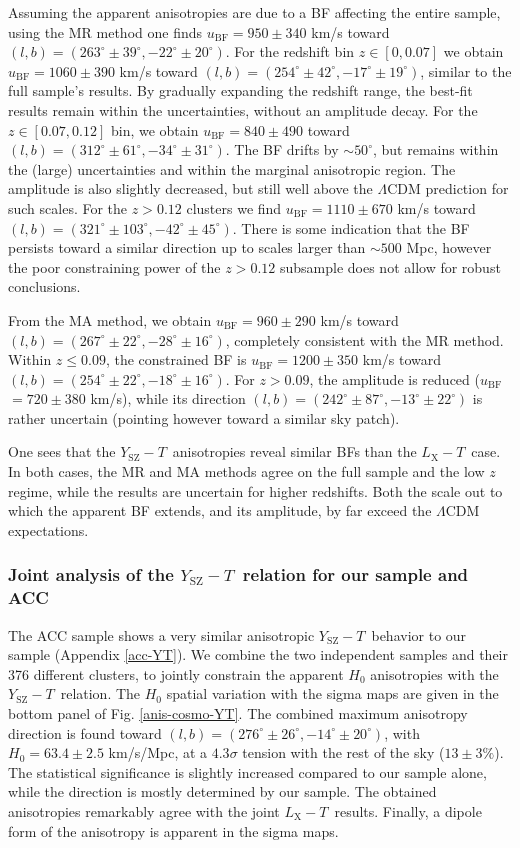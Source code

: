 \documentclass{aa}   %
\newcommand{\LT}{$L_{\text{X}}-T$}
\newcommand{\YT}{$Y_{\text{SZ}}-T$}
\newcommand{\ubf}{$u_{\text{BF}}$}
\begin{document}
Assuming the apparent anisotropies are due to a BF affecting the entire sample, using the MR method one finds \ubf$=950\pm 340$ km/s toward $(l,b)=(263^{\circ}\pm 39^{\circ},-22^{\circ}\pm 20^{\circ})$. For the redshift bin $z\in [0,0.07]$ we obtain \ubf$=1060\pm 390$ km/s toward $(l,b)=(254^{\circ}\pm 42^{\circ},-17^{\circ}\pm 19^{\circ})$, similar to the full sample's results. By gradually expanding the redshift range, the best-fit results remain within the uncertainties, without an amplitude decay. For the $z\in [0.07,0.12]$ bin, we obtain \ubf$=840\pm 490$ toward $(l,b)=(312^{\circ}\pm 61^{\circ},-34^{\circ}\pm 31^{\circ})$. The BF drifts by $\sim 50^{\circ}$, but remains within the (large) uncertainties and within the marginal anisotropic region. The amplitude is also slightly decreased, but still well above the $\Lambda$CDM prediction for such scales. For the $z>0.12$ clusters we find \ubf$=1110\pm 670$ km/s toward $(l,b)=(321^{\circ}\pm 103^{\circ},-42^{\circ}\pm 45^{\circ})$. There is some indication that the BF persists toward a similar direction up to scales larger than $\sim 500$ Mpc, however the poor constraining power of the $z>0.12$ subsample does not allow for robust conclusions.

From the MA method, we obtain \ubf$=960\pm 290$ km/s toward $(l,b)=(267^{\circ}\pm 22^{\circ},-28^{\circ}\pm 16^{\circ})$, completely consistent with the MR method. Within $z\leq 0.09$, the constrained BF is \ubf$=1200\pm 350$ km/s toward $(l,b)=(254^{\circ}\pm 22^{\circ},-18^{\circ}\pm 16^{\circ})$. For $z>0.09$, the amplitude is reduced (\ubf$=720\pm 380$ km/s), while its direction $(l,b)=(242^{\circ}\pm 87^{\circ},-13^{\circ}\pm 22^{\circ})$ is rather uncertain (pointing however toward a similar sky patch).

One sees that the \YT\ anisotropies reveal similar BFs than the \LT\ case. In both cases, the MR and MA methods agree on the full sample and the low $z$ regime, while the results are uncertain for higher redshifts. Both the scale out to which the apparent BF extends, and its amplitude, by far exceed the $\Lambda$CDM expectations. 

\subsubsection{Joint analysis of the \YT\ relation for our sample and ACC}

The ACC sample shows a very similar anisotropic \YT\ behavior to our sample (Appendix \ref{acc-YT}). We combine the two independent samples and their 376 different clusters, to jointly constrain the apparent $H_0$ anisotropies with the \YT\ relation. The $H_0$ spatial variation with the sigma maps are given in the bottom panel of Fig. \ref{anis-cosmo-YT}. The combined maximum anisotropy direction is found toward $(l,b)=(276^{\circ}\pm 26^{\circ},-14^{\circ}\pm20^{\circ} )$, with $H_0=63.4\pm 2.5$ km/s/Mpc, at a $4.3\sigma$ tension with the rest of the sky ($13\pm 3\%$). The statistical significance is slightly increased compared to our sample alone, while the direction is mostly determined by our sample. The obtained anisotropies remarkably agree with the joint \LT\ results. Finally, a dipole form of the anisotropy is apparent in the sigma maps. 
\end{document}
